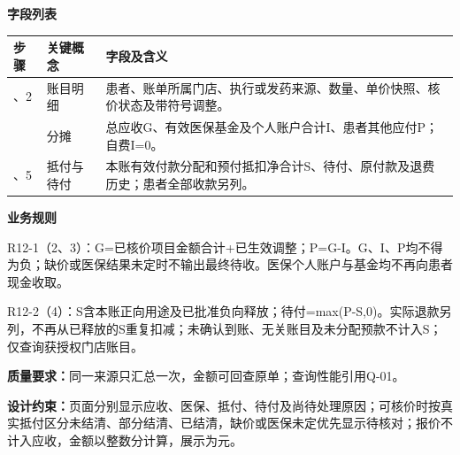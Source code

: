 \documentclass[UTF8,a4paper,zihao=-4,fontset=none]{ctexart}
\begin{document}
\noindent\textbf{字段列表}\par
{\setlength{\tabcolsep}{3pt}\renewcommand{\arraystretch}{1.04}
\noindent\begin{tabular}{@{}>{\raggedright\arraybackslash}p{1.2cm}>{\raggedright\arraybackslash}p{2.2cm}>{\raggedright\arraybackslash}p{12.3cm}@{}}
\toprule
步骤 & 关键概念 & 字段及含义 \\ \midrule
1、2 & 账目明细 & 患者、账单所属门店、执行或发药来源、数量、单价快照、核价状态及带符号调整。 \\
3 & 分摊 & 总应收G、有效医保基金及个人账户合计I、患者其他应付P；自费I=0。 \\
4、5 & 抵付与待付 & 本账有效付款分配和预付抵扣净合计S、待付、原付款及退费历史；患者全部收款另列。 \\
\bottomrule
\end{tabular}\par}
\smallskip
\noindent\textbf{业务规则}\par
\noindent R12-1（2、3）：G=已核价项目金额合计+已生效调整；P=G-I。G、I、P均不得为负；缺价或医保结果未定时不输出最终待收。医保个人账户与基金均不再向患者现金收取。\par
\noindent R12-2（4）：S含本账正向用途及已批准负向释放；待付=max(P-S,0)。实际退款另列，不再从已释放的S重复扣减；未确认到账、无关账目及未分配预款不计入S；仅查询获授权门店账目。\par
\smallskip
\noindent\textbf{质量要求：}同一来源只汇总一次，金额可回查原单；查询性能引用Q-01。\par
\noindent\textbf{设计约束：}页面分别显示应收、医保、抵付、待付及尚待处理原因；可核价时按真实抵付区分未结清、部分结清、已结清，缺价或医保未定优先显示待核对；报价不计入应收，金额以整数分计算，展示为元。\par
\endgroup
\clearpage
\end{document}
